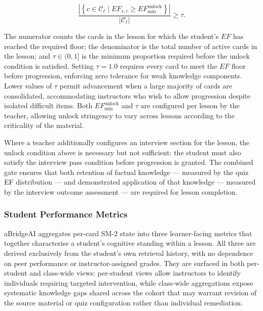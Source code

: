 \begin{equation}
\frac{
    \left|\left\{
        c \in \mathcal{C}_{\ell} \mid 
        EF_{s,c} \geq EF_{\min}^{\text{unlock}}
    \right\}\right|
}{
    \left|\mathcal{C}_{\ell}\right|
} \geq \tau.
\end{equation}

The numerator counts the cards in the lesson for which the student's $EF$ has reached the required floor; the denominator is the total number of active cards in the lesson; and $\tau \in (0, 1]$ is the minimum proportion required before the unlock condition is satisfied. Setting $\tau = 1.0$ requires every card to meet the $EF$ floor before progression, enforcing zero tolerance for weak knowledge components. Lower values of $\tau$ permit advancement when a large majority of cards are consolidated, accommodating instructors who wish to allow progression despite isolated difficult items. Both $EF_{\min}^{\text{unlock}}$ and $\tau$ are configured per lesson by the teacher, allowing unlock stringency to vary across lessons according to the criticality of the material.

Where a teacher additionally configures an interview section for the lesson, the unlock condition above is necessary but not sufficient: the student must also satisfy the interview pass condition before progression is granted. The combined gate ensures that both retention of factual knowledge — measured by the quiz EF distribution — and demonstrated application of that knowledge — measured by the interview outcome assessment — are required for lesson completion.

\subsubsection{Student Performance Metrics}
\label{sec:performance_metrics}

aBridgeAI aggregates per-card SM-2 state into three learner-facing metrics that together characterise a student's cognitive standing within a lesson. All three are derived exclusively from the student's own retrieval history, with no dependence on peer performance or instructor-assigned grades. They are surfaced in both per-student and class-wide views: per-student views allow instructors to identify individuals requiring targeted intervention, while class-wide aggregations expose systematic knowledge gaps shared across the cohort that may warrant revision of the source material or quiz configuration rather than individual remediation.

